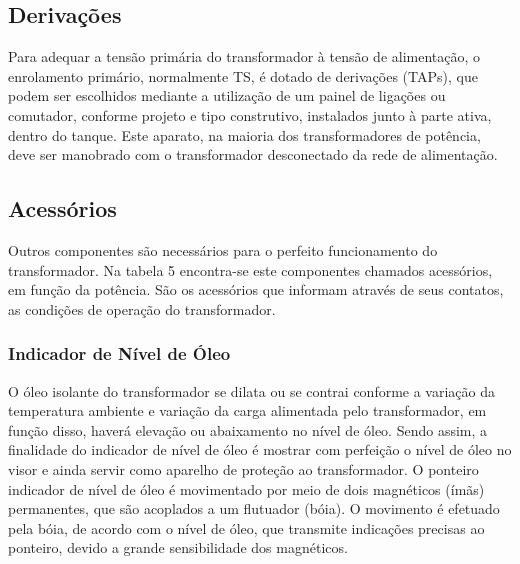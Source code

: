 \documentclass[a5paper,english,spanish,brazil]{ufsc-thesis}
\begin{document}
\subsection{Derivações}
Para adequar a tensão primária do transformador à tensão de alimentação, o enrolamento primário, normalmente TS, é dotado de derivações (TAPs), que podem ser escolhidos mediante a utilização de um painel de ligações ou comutador, conforme projeto e tipo construtivo, instalados junto à parte ativa, dentro do tanque. Este aparato, na maioria dos transformadores de potência, deve ser manobrado com o transformador desconectado da rede de alimentação.

\subsection{Acessórios}
Outros componentes são necessários para o perfeito funcionamento do
transformador. Na tabela 5 encontra-se este componentes chamados acessórios, em
função da potência. São os acessórios que informam através de seus contatos, as
condições de operação do transformador.

\subsubsection{Indicador de Nível de Óleo}
O óleo isolante do transformador se dilata ou se contrai conforme a variação da temperatura ambiente e variação da carga alimentada pelo transformador, em função disso, haverá elevação ou abaixamento no nível de óleo. Sendo assim, a finalidade do indicador de nível de óleo é mostrar com perfeição o nível de óleo no visor e ainda servir como aparelho de proteção ao transformador. O ponteiro indicador de nível de óleo é movimentado por meio de dois magnéticos (ímãs) permanentes, que são acoplados a um flutuador (bóia). O movimento é efetuado pela bóia, de acordo com o nível de óleo, que transmite indicações precisas ao ponteiro, devido a grande sensibilidade dos magnéticos.
\end{document}

